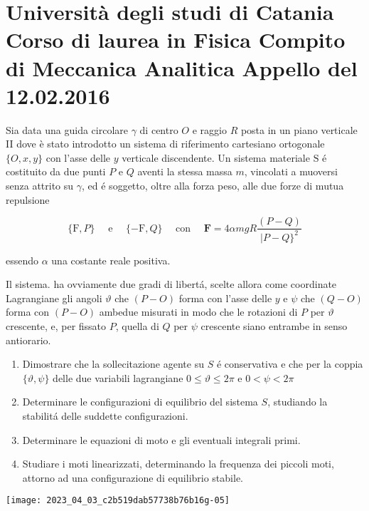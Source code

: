 \documentclass[10pt]{article}
\begin{document}
\section{Università degli studi di Catania
Corso di laurea in Fisica
Compito di Meccanica Analitica
Appello del 12.02.2016}
Sia data una guida circolare \(\gamma\) di centro \(O\) e raggio \(R\) posta in un piano verticale II dove è stato introdotto un sistema di riferimento cartesiano ortogonale \(\{O, x, y\}\) con l'asse delle \(y\) verticale discendente. Un sistema materiale \(\mathrm{S}\) é costituito da due punti \(P\) e \(Q\) aventi la stessa massa \(m\), vincolati a muoversi senza attrito su \(\gamma\), ed é soggetto, oltre alla forza peso, alle due forze di mutua repulsione

\[
\{\mathrm{F}, P\} \quad \text { e } \quad\{-\mathrm{F}, Q\} \quad \text { con } \quad \mathbf{F}=4 \alpha m g R \frac{(P-Q)}{\mid P-Q\}^{2}}
\]

essendo \(\alpha\) una costante reale positiva.

Il sistema. ha ovviamente due gradi di libertá, scelte allora come coordinate Lagrangiane gli angoli \(\vartheta\) che \((P-O)\) forma con l'asse delle \(y\) e \(\psi\) che \((Q-O)\) forma con \((P-O)\) ambedue misurati in modo che le rotazioni di \(P\) per \(\vartheta\) crescente, e, per fissato \(P\), quella di \(Q\) per \(\psi\) crescente siano entrambe in senso antiorario.

\begin{enumerate}
  \item Dimostrare che la sollecitazione agente su \(S\) é conservativa e che per la coppia \(\{\vartheta, \psi\}\) delle due variabili lagrangiane \(0 \leq \vartheta \leq 2 \pi\) e \(0<\psi<2 \pi\)

  \item Determinare le configurazioni di equilibrio del sistema \(S\), studiando la stabilitá delle suddette configurazioni.

  \item Determinare le equazioni di moto e gli eventuali integrali primi.

  \item Studiare i moti linearizzati, determinando la frequenza dei piccoli moti, attorno ad una configurazione di equilibrio stabile.

\end{enumerate}

\begin{center}
\texttt{[image: 2023\_04\_03\_c2b519dab57738b76b16g-05]}
\end{center}
\end{document}
